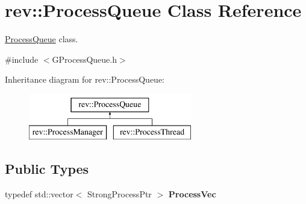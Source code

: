 \hypertarget{classrev_1_1_process_queue}{}\section{rev\+::Process\+Queue Class Reference}
\label{classrev_1_1_process_queue}


\mbox{\hyperlink{classrev_1_1_process_queue}{Process\+Queue}} class.  




{\ttfamily \#include $<$G\+Process\+Queue.\+h$>$}

Inheritance diagram for rev\+::Process\+Queue\+:\begin{figure}[H]
\begin{center}
\leavevmode
\includegraphics[height=2.000000cm]{classrev_1_1_process_queue}
\end{center}
\end{figure}
\subsection*{Public Types}
\begin{DoxyCompactItemize}
\item 
\mbox{\label{classrev_1_1_process_queue_a321091d13abd739512678634110f5f21}} 
typedef std\+::vector$<$ Strong\+Process\+Ptr $>$ {\bfseries Process\+Vec}
\end{DoxyCompactItemize}
